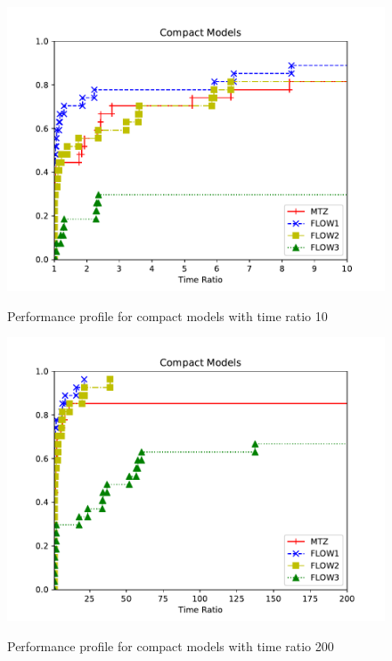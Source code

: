 \begin{figure}[H]
\centering
	\includegraphics[scale=0.9]{media/compact10.pdf} \\
	\caption{Performance profile for compact models with time ratio 10}
	\label{fig:compacts10}
\end{figure}

\begin{figure}[H]
\centering
	\includegraphics[scale=0.9]{media/compact200.pdf} \\
	\caption{Performance profile for compact models with time ratio 200}
	\label{fig:compacts200}
\end{figure}



